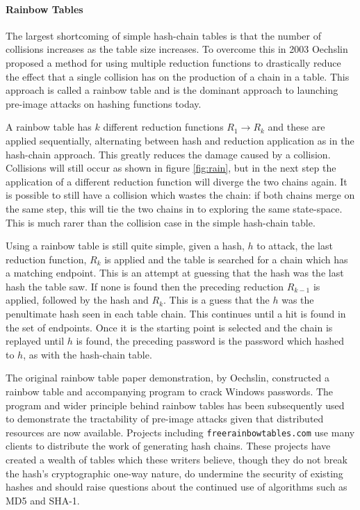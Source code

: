\documentclass[a4paper,12pt]{article}
\begin{document}
\paragraph{Rainbow Tables}
The largest shortcoming of simple hash-chain tables is that the number of collisions increases as the table size increases. To overcome this in 2003 Oechslin\cite{Oechslin} proposed a method for using multiple reduction functions to drastically reduce the effect that a single collision has on the production of a chain in a table. This approach is called a rainbow table and is the dominant approach to launching pre-image attacks on hashing functions today.

A rainbow table has $k$ different reduction functions $R_1 \rightarrow R_k$ and these are applied sequentially, alternating between hash and reduction application as in the hash-chain approach. This greatly reduces the damage caused by a collision. Collisions will still occur as shown in figure \ref{fig:rain}, but in the next step the application of a different reduction function will diverge the two chains again. It is possible to still have a collision which wastes the chain: if both chains merge on the same step, this will tie the two chains in to exploring the same state-space. This is much rarer than the collision case in the simple hash-chain table.

Using a rainbow table is still quite simple, given a hash, $h$ to attack, the last reduction function, $R_k$ is applied and the table is searched for a chain which has a matching endpoint. This is an attempt at guessing that the hash was the last hash the table saw.
If none is found then the preceding reduction $R_{k-1}$ is applied, followed by the hash and $R_k$. This is a guess that the $h$ was the penultimate hash seen in each table chain. This continues until a hit is found in the set of endpoints. Once it is the starting point is selected and the chain is replayed until $h$ is found, the preceding password is the password which hashed to $h$, as with the hash-chain table.


The original rainbow table paper demonstration, by Oechslin, constructed a rainbow table and accompanying program to crack Windows passwords. The program and wider principle behind rainbow tables has been subsequently used to demonstrate the tractability of pre-image attacks given that distributed resources are now available. Projects including \texttt{freerainbowtables.com} use many clients to distribute the work of generating hash chains. These projects have created a wealth of tables which these writers believe, though they do not break the hash's cryptographic one-way nature, do undermine the security of existing hashes and should raise questions about the continued use of algorithms such as MD5 and SHA-1.
\end{document}

